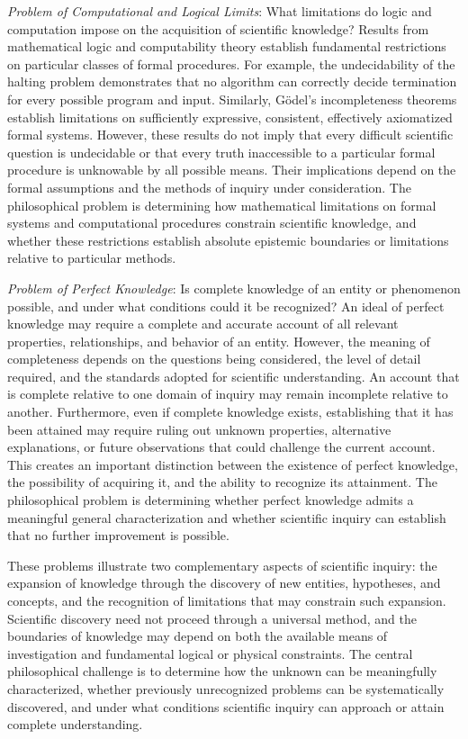 \emph{Problem of Computational and Logical Limits}: What limitations do logic and computation impose on the acquisition of scientific knowledge? Results from mathematical logic and computability theory establish fundamental restrictions on particular classes of formal procedures. For example, the undecidability of the halting problem demonstrates that no algorithm can correctly decide termination for every possible program and input. Similarly, Gödel's incompleteness theorems establish limitations on sufficiently expressive, consistent, effectively axiomatized formal systems. However, these results do not imply that every difficult scientific question is undecidable or that every truth inaccessible to a particular formal procedure is unknowable by all possible means. Their implications depend on the formal assumptions and the methods of inquiry under consideration. The philosophical problem is determining how mathematical limitations on formal systems and computational procedures constrain scientific knowledge, and whether these restrictions establish absolute epistemic boundaries or limitations relative to particular methods.

\emph{Problem of Perfect Knowledge}: Is complete knowledge of an entity or phenomenon possible, and under what conditions could it be recognized? An ideal of perfect knowledge may require a complete and accurate account of all relevant properties, relationships, and behavior of an entity. However, the meaning of completeness depends on the questions being considered, the level of detail required, and the standards adopted for scientific understanding. An account that is complete relative to one domain of inquiry may remain incomplete relative to another. Furthermore, even if complete knowledge exists, establishing that it has been attained may require ruling out unknown properties, alternative explanations, or future observations that could challenge the current account. This creates an important distinction between the existence of perfect knowledge, the possibility of acquiring it, and the ability to recognize its attainment. The philosophical problem is determining whether perfect knowledge admits a meaningful general characterization and whether scientific inquiry can establish that no further improvement is possible.

These problems illustrate two complementary aspects of scientific inquiry: the expansion of knowledge through the discovery of new entities, hypotheses, and concepts, and the recognition of limitations that may constrain such expansion. Scientific discovery need not proceed through a universal method, and the boundaries of knowledge may depend on both the available means of investigation and fundamental logical or physical constraints. The central philosophical challenge is to determine how the unknown can be meaningfully characterized, whether previously unrecognized problems can be systematically discovered, and under what conditions scientific inquiry can approach or attain complete understanding.

